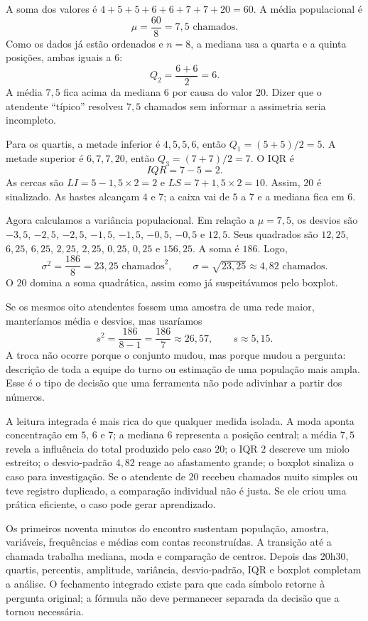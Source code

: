 A soma dos valores é $4+5+5+6+6+7+7+20=60$. A média populacional é
\[
\mu=\frac{60}{8}=7{,}5\text{ chamados}.
\]
Como os dados já estão ordenados e $n=8$, a mediana usa a quarta e a quinta posições, ambas iguais a $6$:
\[
Q_2=\frac{6+6}{2}=6.
\]
A média $7{,}5$ fica acima da mediana $6$ por causa do valor $20$. Dizer que o atendente ``típico'' resolveu $7{,}5$ chamados sem informar a assimetria seria incompleto.

Para os quartis, a metade inferior é ${4,5,5,6}$, então $Q_1=(5+5)/2=5$. A metade superior é ${6,7,7,20}$, então $Q_3=(7+7)/2=7$. O IQR é
\[
IQR=7-5=2.
\]
As cercas são $LI=5-1{,}5\times2=2$ e $LS=7+1{,}5\times2=10$. Assim, $20$ é sinalizado. As hastes alcançam $4$ e $7$; a caixa vai de $5$ a $7$ e a mediana fica em $6$.

Agora calculamos a variância populacional. Em relação a $\mu=7{,}5$, os desvios são $-3{,}5$, $-2{,}5$, $-2{,}5$, $-1{,}5$, $-1{,}5$, $-0{,}5$, $-0{,}5$ e $12{,}5$. Seus quadrados são $12{,}25$, $6{,}25$, $6{,}25$, $2{,}25$, $2{,}25$, $0{,}25$, $0{,}25$ e $156{,}25$. A soma é $186$. Logo,
\[
\sigma^2=\frac{186}{8}=23{,}25\text{ chamados}^2,
\qquad
\sigma=\sqrt{23{,}25}\approx4{,}82\text{ chamados}.
\]
O $20$ domina a soma quadrática, assim como já suspeitávamos pelo boxplot.

Se os mesmos oito atendentes fossem uma amostra de uma rede maior, manteríamos média e desvios, mas usaríamos
\[
s^2=\frac{186}{8-1}=\frac{186}{7}\approx26{,}57,
\qquad
s\approx5{,}15.
\]
A troca não ocorre porque o conjunto mudou, mas porque mudou a pergunta: descrição de toda a equipe do turno ou estimação de uma população mais ampla. Esse é o tipo de decisão que uma ferramenta não pode adivinhar a partir dos números.

A leitura integrada é mais rica do que qualquer medida isolada. A moda aponta concentração em $5$, $6$ e $7$; a mediana $6$ representa a posição central; a média $7{,}5$ revela a influência do total produzido pelo caso $20$; o IQR $2$ descreve um miolo estreito; o desvio-padrão $4{,}82$ reage ao afastamento grande; o boxplot sinaliza o caso para investigação. Se o atendente de $20$ recebeu chamados muito simples ou teve registro duplicado, a comparação individual não é justa. Se ele criou uma prática eficiente, o caso pode gerar aprendizado.

Os primeiros noventa minutos do encontro sustentam população, amostra, variáveis, frequências e médias com contas reconstruídas. A transição até a chamada trabalha mediana, moda e comparação de centros. Depois das 20h30, quartis, percentis, amplitude, variância, desvio-padrão, IQR e boxplot completam a análise. O fechamento integrado existe para que cada símbolo retorne à pergunta original; a fórmula não deve permanecer separada da decisão que a tornou necessária.


